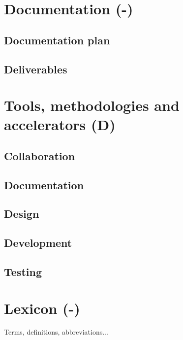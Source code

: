\documentclass[a4paper,12pt,abstracton,titlepage]{scrartcl}
\begin{document}
\section{Documentation (-)}
\label{sec:documentation}
\subsection{Documentation plan}
\subsection{Deliverables}

\section{Tools, methodologies and accelerators (D)}
\label{sec:tools-methodologies}
\subsection{Collaboration}
\subsection{Documentation}
\subsection{Design}
\subsection{Development}
\subsection{Testing}

\newpage
\appendix
\section{Lexicon (-)}
\label{sec:lexicon}
Terms, definitions, abbreviations...
\end{document}
